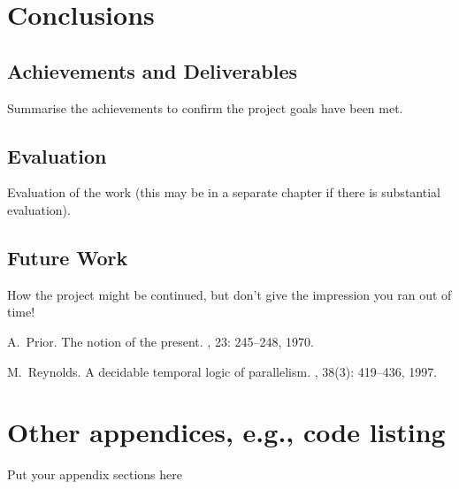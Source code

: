 \documentclass{report}
\begin{document}
\chapter{Conclusions}
\section{Achievements and Deliverables}
Summarise the achievements to confirm the project goals have been met.
\section{Evaluation}
Evaluation of the work (this may be in a separate chapter if there is substantial evaluation).
\section{Future Work}
How the project might be continued, but don't give the impression you ran out of time!

\appendix


\begin{thebibliography}{HHM99}


A.~Prior.
\newblock The notion of the present.
, 23:  245--248, 1970.


M.~Reynolds.
\newblock A decidable temporal logic of parallelism.
, 38(3):  419--436,
  1997.
\end{thebibliography}
\chapter{Other appendices, e.g., code listing}
Put your appendix sections here
\end{document}
